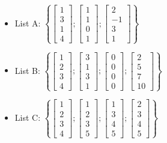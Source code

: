 \begin{itemize}

\item 
List A:
$\left\{ \left[ \begin{array}{c} 1 \\ 3 \\ 1 \\4 \end{array} \right]; 
\left[ \begin{array}{c} 1 \\ 1 \\ 0 \\ 1 \end{array} \right]; 
\left[ \begin{array}{c} 2 \\ -1 \\ 3 \\ 1 \end{array} \right] \right\}
$


\item
List B:
$\left\{\left[ \begin{array}{c} 1 \\ 2 \\ 3 \\ 4 \end{array} \right] ; 
\left[ \begin{array}{c} 3 \\ 1 \\ 3 \\ 1\end{array} \right] ; 
\left[ \begin{array}{c} 0 \\ 0 \\ 0 \\ 0\end{array} \right] ; 
\left[ \begin{array}{c} 2 \\ 5 \\ 7  \\ 10 \end{array} \right] \right\} $



\item 
List C:
$\left\{
\left[ \begin{array}{c} 1 \\ 2 \\ 3 \\ 4  \end{array} \right] ;
\left[ \begin{array}{c} 1 \\ 2 \\ 3 \\ 5 \end{array} \right] ;
\left[ \begin{array}{c} 1 \\ 3 \\ 4 \\ 5  \end{array} \right] ; 
\left[ \begin{array}{c} 2 \\ 3 \\ 4 \\ 5 \end{array} \right] \right\} $


\end{itemize}
